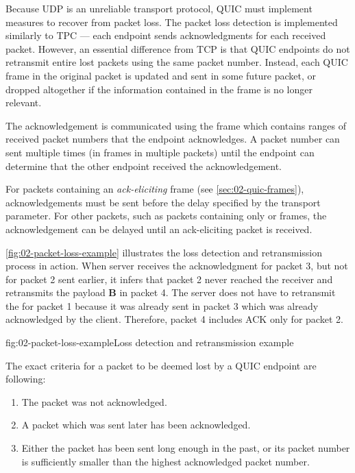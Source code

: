 Because UDP is an unreliable transport protocol, QUIC must implement measures to recover from packet
loss. The packet loss detection is implemented similarly to TPC --- each endpoint sends
acknowledgments for each received packet. However, an essential difference from TCP is that QUIC
endpoints do not retransmit entire lost packets using the same packet number. Instead, each QUIC
frame in the original packet is updated and sent in some future packet, or dropped altogether if the
information contained in the frame is no longer relevant.

The acknowledgement is communicated using the \ACK{} frame which contains ranges of received packet
numbers that the endpoint acknowledges. A packet number can sent multiple times (in \ACK{} frames in
multiple packets) until the endpoint can determine that the other endpoint received the
acknowledgement.

For packets containing an \textit{ack-eliciting} frame (see \autoref{sec:02-quic-frames}),
acknowledgements must be sent before the delay specified by the \MaxAckDelay{} transport
parameter. For other packets, such as packets containing only \ACK{} or \PADDING{} frames, the
acknowledgement can be delayed until an ack-eliciting packet is received.

\autoref{fig:02-packet-loss-example} illustrates the loss detection and retransmission process in
action. When server receives the acknowledgment for packet 3, but not for packet 2 sent earlier, it
infers that packet 2 never reached the receiver and retransmits the payload \textbf{B} in packet 4.
The server does not have to retransmit the \ACK{} for packet 1 because it was already sent in packet
3 which was already acknowledged by the client. Therefore, packet 4 includes ACK only for packet 2.

\begin{myFigure}{fig:02-packet-loss-example}{Loss detection and retransmission example}



\end{myFigure}

The exact criteria for a packet to be deemed lost by a QUIC endpoint are following:

\begin{enumerate}

  \item The packet was not acknowledged.

  \item A packet which was sent later has been acknowledged.

  \item Either the packet has been sent long enough in the past, or its packet number is
sufficiently smaller than the highest acknowledged packet number.

\end{enumerate}

